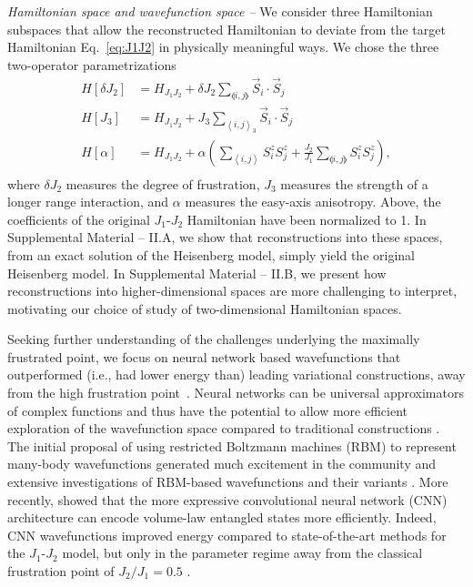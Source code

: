 \documentclass[amsmath,amssymb,aps,prl,superscriptaddress,twocolumn,floatfix]{revtex4}
\begin{document}
{\it Hamiltonian space and wavefunction space --} We consider three Hamiltonian subspaces that allow the reconstructed Hamiltonian to deviate from the target Hamiltonian Eq.~\eqref{eq:J1J2} in physically meaningful ways.
We chose the three two-operator parametrizations
\begin{equation}
\label{eq:spaces}
    \begin{split}
        H[\delta J_2] &= H_{J_1J_2} + \delta J_2 \sum_{\llangle i, j\rrangle} \vec{S}_i \cdot \vec{S}_j \\
        H[J_3] &= H_{J_1J_2} + J_3 \sum_{\left< i, j\right>_3} \vec{S}_i \cdot \vec{S}_j \\
        H[\alpha] &= H_{J_1J_2} + \alpha \left( \sum_{\left< i, j\right>} S^z_i S^z_{j} + \frac{J_2}{J_1} \sum_{\llangle i, j\rrangle} S^z_i S^z_{j} \right),\\
    \end{split}
\end{equation}
where $\delta J_2$ measures the degree of frustration, $J_3$ measures the strength of a longer range interaction, and $\alpha$ measures the easy-axis anisotropy.
Above, the coefficients of the original $J_1$-$J_2$ Hamiltonian have been normalized to 1.
In Supplemental Material -- II.A, we show that reconstructions into these spaces, from an exact solution of the Heisenberg model, simply yield the original Heisenberg model.
In Supplemental Material -- II.B, we present how reconstructions into higher-dimensional spaces are more challenging to interpret, motivating our choice of study of two-dimensional Hamiltonian spaces.

Seeking further understanding of the challenges underlying the maximally frustrated point, we focus on neural network based wavefunctions that outperformed (i.e., had lower energy than) leading variational constructions, away from the high frustration point~\cite{PhysRevB.100.125124}. 
Neural networks can be universal approximators of complex functions \cite{cybenko1989,bishop-book} and thus have the potential to allow more efficient exploration of the wavefunction space compared to traditional constructions \cite{deng2017prx}. 
The initial proposal of using restricted Boltzmann machines (RBM) to represent many-body wavefunctions \cite{Carleo602} generated much excitement in the community and extensive investigations of RBM-based wavefunctions and their variants \cite{PhysRevB.96.205152,carleo_nomura_imada_2018,PhysRevB.97.085104,PhysRevX.8.011006,doi:10.7566/JPSJ.87.014001,PhysRevLett.121.167204,kochkov2018variational,Luo_2019,PhysRevB.99.165123,sharir2020deep,nomura2020diractype,Gao_2017}.  More recently, \textcite{yoav2019prl} showed that the more expressive convolutional neural network (CNN) architecture can encode volume-law entangled states more efficiently. Indeed, CNN wavefunctions improved energy compared to state-of-the-art methods for the $J_1$-$J_2$ model, but only in the parameter regime away from the classical frustration point of $J_2/J_1=0.5$ \cite{PhysRevB.100.125124}.
\end{document}
